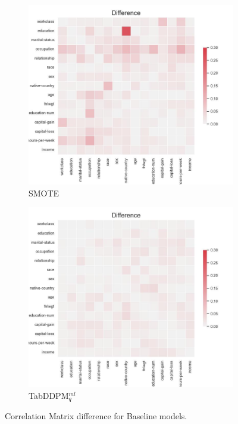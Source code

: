 \begin{figure}[h]
\begin{subfigure}{0.3\textwidth}
	\end{subfigure}
	\begin{subfigure}{0.3\textwidth}
		\includegraphics[width=\textwidth]{images/correlation_difference/smote.jpg}
		\caption{SMOTE}

	\end{subfigure}
	\begin{subfigure}{0.3\textwidth}
		\includegraphics[width=\textwidth]{images/correlation_difference/tab-ddpm.jpg}
		\caption{TabDDPM$^{ml}_q$}
	\end{subfigure}
	\caption[Correlation plots Baseline Models]{Correlation Matrix difference for Baseline models.}
	\label{fig:corr_base}
\end{figure}


